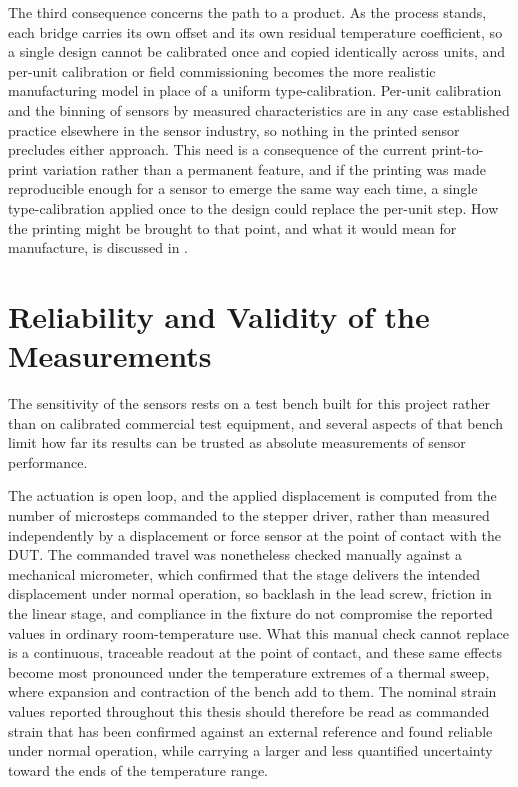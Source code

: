 The third consequence concerns the path to a product. As the process stands, each bridge carries its own offset and its own residual temperature coefficient, so a single design cannot be calibrated once and copied identically across units, and per-unit calibration or field commissioning becomes the more realistic manufacturing model in place of a uniform type-calibration. Per-unit calibration and the binning of sensors by measured characteristics are in any case established practice elsewhere in the sensor industry, so nothing in the printed sensor precludes either approach. This need is a consequence of the current print-to-print variation rather than a permanent feature, and if the printing was made reproducible enough for a sensor to emerge the same way each time, a single type-calibration applied once to the design could replace the per-unit step. How the printing might be brought to that point, and what it would mean for manufacture, is discussed in .

\section{Reliability and Validity of the Measurements} \label{sec:reliability}
The sensitivity of the sensors rests on a test bench built for this project rather than on calibrated commercial test equipment, and several aspects of that bench limit how far its results can be trusted as absolute measurements of sensor performance.

The actuation is open loop, and the applied displacement is computed from the number of microsteps commanded to the stepper driver, rather than measured independently by a displacement or force sensor at the point of contact with the DUT. The commanded travel was nonetheless checked manually against a mechanical micrometer, which confirmed that the stage delivers the intended displacement under normal operation, so backlash in the lead screw, friction in the linear stage, and compliance in the fixture do not compromise the reported values in ordinary room-temperature use. What this manual check cannot replace is a continuous, traceable readout at the point of contact, and these same effects become most pronounced under the temperature extremes of a thermal sweep, where expansion and contraction of the bench add to them. The nominal strain values reported throughout this thesis should therefore be read as commanded strain that has been confirmed against an external reference and found reliable under normal operation, while carrying a larger and less quantified uncertainty toward the ends of the temperature range.

